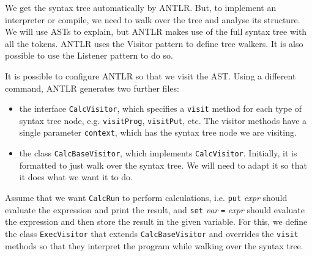 \documentclass[a4paper, openany]{memoir}
\begin{document}
We get the syntax tree automatically by ANTLR. But, to implement an interpreter or compile, we need to walk over the tree and analyse its structure. We will use ASTs to explain, but ANTLR makes use of the full syntax tree with all the tokens. ANTLR uses the Visitor pattern to define tree walkers. It is also possible to use the Listener pattern to do so.

It is possible to configure ANTLR so that we visit the AST. Using a different command, ANTLR generates two further files:
\begin{itemize}
    \item the interface \texttt{CalcVisitor}, which specifies a \texttt{visit} method for each type of syntax tree node, e.g. \texttt{visitProg}, \texttt{visitPut}, etc. The visitor methods have a single parameter \texttt{context}, which has the syntax tree node we are visiting.
    \item the class \texttt{CalcBaseVisitor}, which implements \texttt{CalcVisitor}. Initially, it is formatted to just walk over the syntax tree. We will need to adapt it so that it does what we want it to do.
\end{itemize}

Assume that we want \texttt{CalcRun} to perform calculations, i.e. \texttt{put} \textit{expr} should evaluate the expression and print the result, and \texttt{set} \textit{var} \texttt{=} \textit{expr} should evaluate the expression and then store the result in the given variable. For this, we define the class \texttt{ExecVisitor} that extends \texttt{CalcBaseVisitor} and overrides the \texttt{visit} methods so that they interpret the program while walking over the syntax tree.
\end{document}
